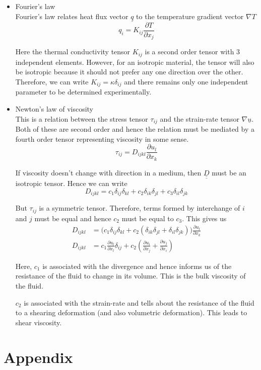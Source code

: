 \documentclass[11pt, letterpaper]{article}
\newcommand{\dl}{\delta}
\newcommand{\1}{\bm{1}}
\newcommand{\pd}[2]{\frac{\partial #1}{\partial #2}}
\newcommand{\uu}[1]{\underline{\underline{#1}}}
\newcommand{\un}[1]{\underline{#1}}
\begin{document}
\begin{itemize}
  \item Fourier's law \\
  Fourier's law relates heat flux vector $\un{q}$ to the temperature gradient vector $\nabla T$
$$
q_i = K_{ij} \pd{T}{x_j}
$$

Here the thermal conductivity tensor $K_{ij}$ is a second order tensor with 3 independent elements. However, for an isotropic material, the tensor will also be isotropic because it should not prefer any one direction over the other. Therefore, we can write $K_{ij} = \kappa \dl_{ij}$ and there remains only one independent parameter to be determined experimentally.

  \item Newton's law of viscosity \\
  This is a relation between the stress tensor $\tau_{ij}$ and the strain-rate tensor $\nabla \un{u}$. Both of these are second order and hence the relation must be mediated by a fourth order tensor representing viscosity in some sense.
$$
\tau_{ij} = D_{ijkl} \pd{u_l}{x_k}
$$

If viscosity doesn't change with direction in a medium, then $\uu{D}$ must be an isotropic tensor. Hence we can write
$$D_{ijkl} = c_1\dl_{ij}\dl_{kl} + c_2\dl_{ik}\dl_{jl} + c_3\dl_{il}\dl_{jk} $$

But $\tau_{ij}$ is a symmetric tensor. Therefore, terms formed by interchange of $i$ and $j$ must be equal and hence $c_2$ must be equal to $c_3$. This gives us
\begin{align*}
D_{ijkl} &= \bigg(c_1\dl_{ij}\dl_{kl} + c_2(\dl_{ik}\dl_{jl} + \dl_{il}\dl_{jk})\bigg)\pd{u_l}{x_k}\\
D_{ijkl} &= c_1\pd{u_l}{x_l}\dl_{ij} + c_2(\pd{u_i}{x_j}+\pd{u_j}{x_i})
\end{align*}

Here, $c_1$ is associated with the divergence and hence informs us of the resistance of the fluid to change in its volume. This is the bulk viscosity of the fluid.

$c_2$ is associated with the strain-rate and tells about the resistance of the fluid to a shearing deformation (and also volumetric deformation). This leads to shear viscosity.

\end{itemize}



\section*{Appendix}
\end{document}
